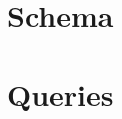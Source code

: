 \documentclass[letterpaper, 12pt]{article}
\begin{document}
\section{Schema}

%  
%
%  

\section{Queries}
\end{document}
